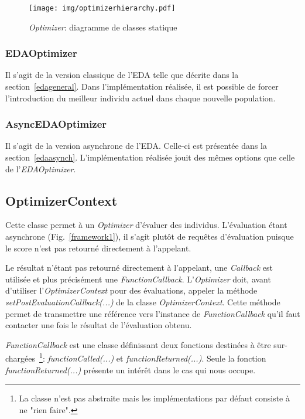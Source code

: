 \documentclass[a4paper, 12pt]{report}
\begin{document}
\begin{figure}[!p]
\centering
\texttt{[image: img/optimizerhierarchy.pdf]}
\caption{\textit{Optimizer}: diagramme de classes statique}
\label{optimizerhierarchy}
\end{figure}

\subsubsection{EDAOptimizer} 
Il s'agit de la version classique de l'EDA telle que décrite dans la section~\ref{edageneral}. Dans l'implémentation réalisée, il est possible de forcer l'introduction du meilleur individu actuel dans chaque nouvelle population.

\subsubsection{AsyncEDAOptimizer} 
Il s'agit de la version asynchrone de l'EDA. Celle-ci est présentée dans la section~\ref{edaasynch}. L'implémentation réalisée jouit des mêmes options que celle de l'\textit{EDAOptimizer}.  


\subsection{OptimizerContext}
\label{optimizecontextsection}
Cette classe permet à un \textit{Optimizer} d'évaluer des individus. L'évaluation étant asynchrone (Fig.~\ref{framework1}), il s'agit plutôt de requêtes d'évaluation puisque le score n'est pas retourné directement à l'appelant.

Le résultat n'étant pas retourné directement à l'appelant, une \textit{Callback} est utilisée et plus précisément une \textit{FunctionCallback}. L'\textit{Optimizer} doit, avant d'utiliser l'\textit{OptimizerContext} pour des évaluations, appeler la méthode \textit{setPostEvaluationCallback(...)} de la classe \textit{OptimizerContext}. Cette méthode permet de transmettre une référence vers l'instance de \textit{FunctionCallback} qu'il faut contacter une fois le résultat de l'évaluation obtenu. 

\textit{FunctionCallback} est une classe définissant deux fonctions destinées à être sur-chargées~\footnote{La classe n'est pas abstraite mais les implémentations par défaut consiste à ne "rien faire".}: \textit{functionCalled(...)} et \textit{functionReturned(...)}. Seule la fonction \textit{functionReturned(...)} présente un intérêt dans le cas qui nous occupe.
\end{document}
